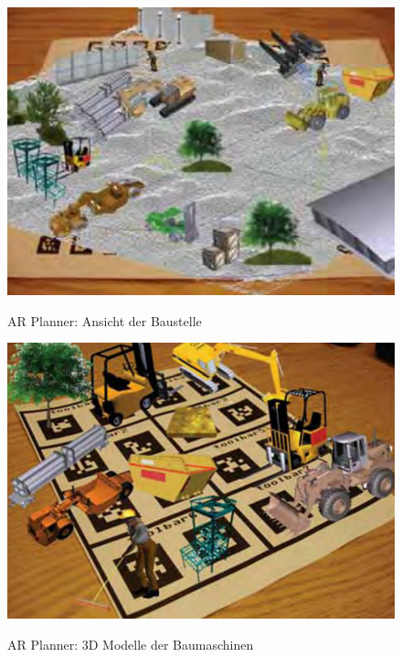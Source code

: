 \begin{figure}[h]
	\begin{center}
		\noindent\includegraphics[scale=0.4]{Resources/Hintergrund/baustelle.png}
		\label{baustelle}
		\caption[AR Planner: Ansicht der Baustelle]{AR Planner: Ansicht der Baustelle\footnotemark}	
	\end{center}
\end{figure}


\begin{figure}[h]
	\begin{center}
		\noindent\includegraphics[scale=0.4]{Resources/Hintergrund/bauModelle.png}
		\label{bauModelle}
		\caption[AR Planner: 3D Modelle der Baumaschinen]{AR Planner: 3D Modelle der Baumaschinen\footnotemark}	
	\end{center}
\end{figure}

